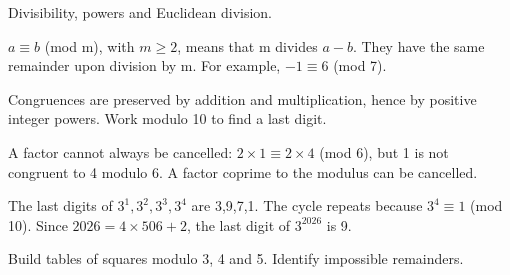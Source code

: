 \documentclass[11pt]{article}
\begin{document}
Divisibility, powers and Euclidean division.\par
{}
\(a \equiv  b\) (mod m), with \(m \geq  2\), means that m divides \(a - b\). They have the same remainder upon division by m. For example, −\(1 \equiv  6\) (mod 7).\par
Congruences are preserved by addition and multiplication, hence by positive integer powers. Work modulo 10 to find a last digit.\par
A factor cannot always be cancelled: \(2 \times  1 \equiv  2 \times  4\) (mod 6), but 1 is not congruent to 4 modulo 6. A factor coprime to the modulus can be cancelled.\par
{}
The last digits of \(3^{1}, 3^{2}, 3^{3}, 3^{4}\) are 3,9,7,1. The cycle repeats because \(3^{4} \equiv  1\) (mod 10). Since \(2026 = 4 \times  506 + 2\), the last digit of \(3^{2026}\) is 9.\par
{}
Build tables of squares modulo 3, 4 and 5. Identify impossible remainders.\par
\end{document}
